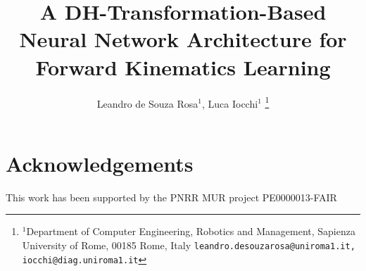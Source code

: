 \documentclass[letterpaper, 10pt, conference]{IEEEconf}
\title{\LARGE \bf A DH-Transformation-Based Neural Network Architecture for Forward Kinematics Learning}
\author{Leandro de Souza Rosa$^{1}$, Luca Iocchi$^{1}$%
	\thanks{$^{1}$Department of Computer Engineering, Robotics and Management,
		Sapienza University of Rome, 00185 Rome, Italy
		{\tt\small leandro.desouzarosa@uniroma1.it, iocchi@diag.uniroma1.it}
	}%
}
\begin{document}
\maketitle
\thispagestyle{empty}
\pagestyle{empty}








%


\section*{Acknowledgements}
This work has been supported by the PNRR MUR project PE0000013-FAIR




%

\vfill
\end{document}
